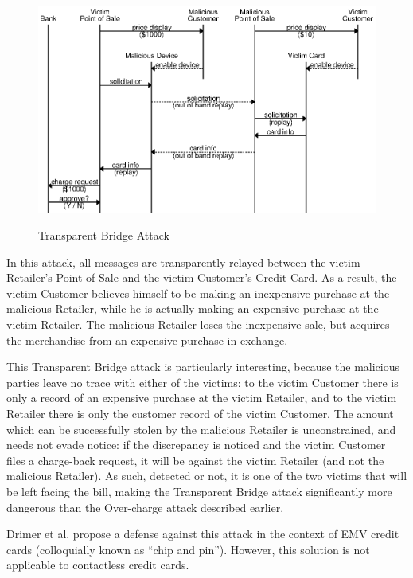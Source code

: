 \begin{figure}
  \caption{Transparent Bridge Attack}
  \centering
  	\hspace*{-0.35in}
    \includegraphics{img/attack-mr-bridge.eps}
  \label{fig:attack_bridge}
\end{figure}

In this attack, all messages are transparently relayed between the victim Retailer's Point of Sale and the victim Customer's Credit Card.
As a result, the victim Customer believes himself to be making an inexpensive purchase at the malicious Retailer, while he is actually making an expensive purchase at the victim Retailer.
The malicious Retailer loses the inexpensive sale, but acquires the merchandise from an expensive purchase in exchange.

This Transparent Bridge attack is particularly interesting, because the malicious parties leave no trace with either of the victims:
to the victim Customer there is only a record of an expensive purchase at the victim Retailer, and to the victim Retailer there is only the customer record of the victim Customer.
The amount which can be successfully stolen by the malicious Retailer is unconstrained, and needs not evade notice:
	if the discrepancy is noticed and the victim Customer files a charge-back request, it will be against the victim Retailer (and not the malicious Retailer).
As such, detected or not, it is one of the two victims that will be left facing the bill, making the Transparent Bridge attack significantly more dangerous than the Over-charge attack described earlier.

Drimer et al. propose a defense against this attack in the context of EMV credit cards (colloquially known as ``chip and pin'').
However, this solution is not applicable to contactless credit cards.

